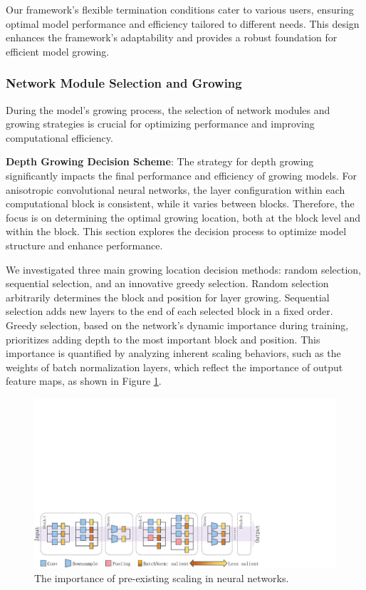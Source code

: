 \documentclass[preprint,12pt]{elsarticle}
\begin{document}
Our framework's flexible termination conditions cater to various users, ensuring optimal model performance and efficiency tailored to different needs. This design enhances the framework's adaptability and provides a robust foundation for efficient model growing.

\subsubsection{Network Module Selection and Growing}

During the model's growing process, the selection of network modules and growing strategies is crucial for optimizing performance and improving computational efficiency.

\textbf{Depth Growing Decision Scheme}: The strategy for depth growing significantly impacts the final performance and efficiency of growing models. For anisotropic convolutional neural networks, the layer configuration within each computational block is consistent, while it varies between blocks. Therefore, the focus is on determining the optimal growing location, both at the block level and within the block. This section explores the decision process to optimize model structure and enhance performance.

We investigated three main growing location decision methods: random selection, sequential selection, and an innovative greedy selection. Random selection arbitrarily determines the block and position for layer growing. Sequential selection adds new layers to the end of each selected block in a fixed order. Greedy selection, based on the network's dynamic importance \cite{bnpruning} during training, prioritizes adding depth to the most important block and position. This importance is quantified by analyzing inherent scaling behaviors, such as the weights of batch normalization layers, which reflect the importance of output feature maps, as shown in Figure \ref{fig:saliency}.

\begin{figure}
  \centering
  \includegraphics[width=\textwidth]{imgs/saliency.pdf}
  \caption{The importance of pre-existing scaling in neural networks.}
  \label{fig:saliency}
\end{figure}
\end{document}
